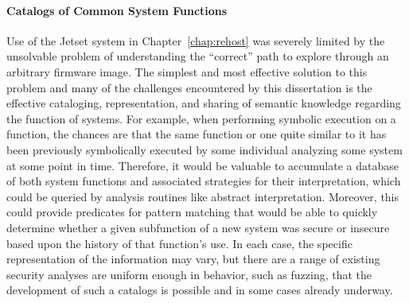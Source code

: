 \paragraph{Catalogs of Common System Functions}
Use of the Jetset system in Chapter~\ref{chap:rehost} was severely limited by the unsolvable problem of understanding the ``correct'' path to explore through an arbitrary firmware image.
The simplest and most effective solution to this problem and many of the challenges encountered by this dissertation is the effective cataloging, representation, and sharing of semantic knowledge regarding the function of systems.
For example, when performing symbolic execution on a function, the chances are that the same function or one quite similar to it has been previously symbolically executed by some individual analyzing some system at some point in time.
Therefore, it would be valuable to accumulate a database of both system functions and associated strategies for their interpretation, which could be queried by analysis routines like abstract interpretation.
Moreover, this could provide predicates for pattern matching that would be able to quickly determine whether a given subfunction of a new system was secure or insecure based upon the history of that function's use.
In each case, the specific representation of the information may vary, but there are a range of existing security analyses are uniform enough in behavior, such as fuzzing, that the development of such a catalogs is possible and in some cases already underway.
